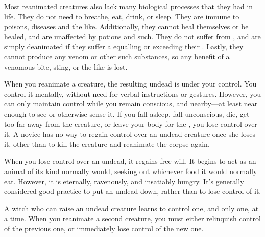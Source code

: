 Most reanimated creatures also lack many biological processes that they had in life.
They do not need to breathe, eat, drink, or sleep.
They are immune to poisons, diseases and the like.
Additionally, they cannot heal themselves or be healed, and are unaffected by potions and such.
They do not suffer from {\shock}, and are simply deanimated if they suffer a {\damagetest} equalling or exceeding their .
Lastly, they cannot produce any venom or other such substances, so any benefit of a venomous bite, sting, or the like is lost.

When you reanimate a creature, the resulting undead is under your control.
You control it mentally, without need for verbal instructions or gestures.
However, you can only maintain control while you remain conscious, and nearby---at least near enough to see or otherwise sense it.
If you fall asleep, fall unconscious, die, get too far away from the creature, or leave your body for the {\mentalrealm}, you lose control over it.
A novice  has no way to regain control over an undead creature once she loses it, other than to kill the creature and reanimate the corpse again.

When you lose control over an undead, it regains free will.
It begins to act as an animal of its kind normally would, seeking out whichever food it would normally eat.
However, it is eternally, ravenously, and insatiably hungry.
It's generally considered good practice to put an undead down, rather than to lose control of it.

A witch who can raise an undead creature learns to control one, and only one, at a time.
When you reanimate a second creature, you must either relinquish control of the previous one, or immediately lose control of the new one.


